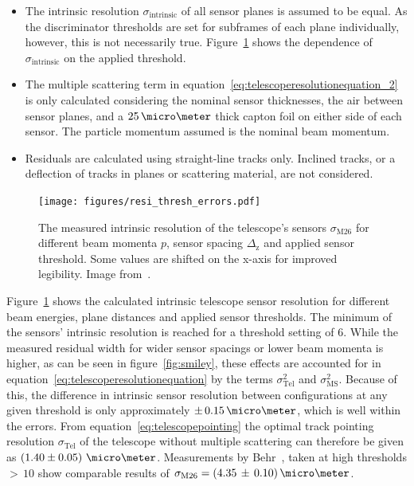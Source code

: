 \begin{itemize}
\item The intrinsic resolution $\sigma_{\textrm{intrinsic}}$ of all sensor planes is assumed to be equal.
As the discriminator thresholds are set for subframes of each plane individually, however, this is not necessarily true.
Figure~\ref{fig:resivsenergy} shows the dependence of $\sigma_{\textrm{intrinsic}}$ on the applied threshold.

\item The multiple scattering term in equation~\ref{eq:telescoperesolutionequation_2} is only calculated considering the nominal sensor thicknesses, the air between sensor planes,
 and a $25\,\micro\meter$ thick capton foil on either side of each sensor.
The particle momentum assumed is the nominal beam momentum.

\item Residuals are calculated using straight-line tracks only.
Inclined tracks, or a deflection of tracks in planes or scattering material, are not considered.
\end{itemize}

\begin{figure}[tbp]
\centering

\texttt{[image: figures/resi\_thresh\_errors.pdf]}
\caption[Telescope intrinsic sensor resolution for different threshold settings, beam momenta and geometries~\cite{ref:thomas}]{
 The measured intrinsic resolution of the \Datura telescope's \Mimosa sensors $\sigma_{\textrm{M26}}$ for different beam momenta $p$, sensor spacing $\Delta_{\textrm{z}}$ and applied sensor threshold.
Some values are shifted on the x-axis for improved legibility.
Image from~\cite{ref:thomas}.}
\label{fig:resivsenergy}
\end{figure}

Figure~\ref{fig:resivsenergy} shows the calculated intrinsic telescope sensor resolution for different beam energies, plane distances and applied sensor thresholds.
The minimum of the \Mimosa sensors' intrinsic resolution is reached for a threshold setting of $6$.
While the measured residual width for wider sensor spacings or lower beam momenta is higher, as can be seen in figure~\ref{fig:smiley},
 these effects are accounted for in equation~\ref{eq:telescoperesolutionequation} by the terms $\sigma_{\textrm{Tel}}^2$ and $\sigma_{\textrm{MS}}^2$.
Because of this, the difference in intrinsic sensor resolution between configurations at any given threshold is only approximately $\pm\,0.15\,\micro\meter$, which is well within the errors.
From equation~\ref{eq:telescopepointing} the optimal track pointing resolution $\sigma_{\textrm{Tel}}$ of the \Datura telescope without multiple scattering
 can therefore be given as $\left( 1.40 \pm 0.05 \right)\,\micro\meter$.
Measurements by Behr~\cite{ref:j.behrmeasurements}, taken at high thresholds $>\,10$ show comparable results of $\sigma_{\textrm{M26}} = (4.35\,\pm\,0.10)\,\micro\meter$.

